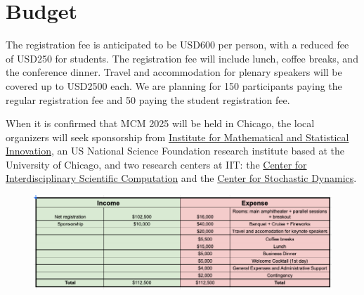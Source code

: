 \documentclass{article}
\begin{document}
\section{Budget}
The registration fee is anticipated to be USD600 per person, with a reduced fee of USD250 for students.  The registration fee will include lunch, coffee breaks, and the conference dinner. Travel and accommodation for plenary speakers will be covered up to USD2500 each.  We are planning for 150 participants paying the regular registration fee and 50 paying the student registration fee.

When it is confirmed that MCM 2025 will be held in Chicago, the local organizers will seek sponsorship from \href{https://www.imsi.institute}{Institute for Mathematical and Statistical Innovation}, an US National Science Foundation research institute based at the University of Chicago, and two research centers at IIT: the  \href{https://cos.iit.edu/cisc/}{Center for Interdisciplinary Scientific Computation} and the \href{https://mypages.iit.edu/~duan/LSD.html}{Center for Stochastic Dynamics}.






\begin{figure}[h]
    \centering
    \includegraphics[width =.95\textwidth]{MCMBudget.png}
\end{figure}
\end{document}
